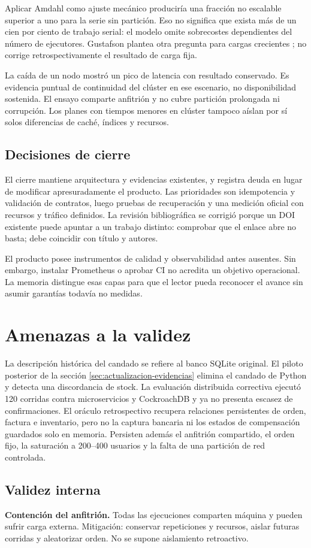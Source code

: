 \documentclass[12pt,a4paper]{article}
\newcommand{\seccion}[1]{\section{#1}}
\begin{document}
Aplicar Amdahl como ajuste mecánico produciría una fracción no escalable superior a uno para la serie sin partición. Eso no significa que exista más de un cien por ciento de trabajo serial: el modelo omite sobrecostes dependientes del número de ejecutores. Gustafson plantea otra pregunta para cargas crecientes \cite{gustafson1988reevaluating}; no corrige retrospectivamente el resultado de carga fija.

La caída de un nodo mostró un pico de latencia con resultado conservado. Es evidencia puntual de continuidad del clúster en ese escenario, no disponibilidad sostenida. El ensayo comparte anfitrión y no cubre partición prolongada ni corrupción. Los planes con tiempos menores en clúster tampoco aíslan por sí solos diferencias de caché, índices y recursos.

\subsection{Decisiones de cierre}
El cierre mantiene arquitectura y evidencias existentes, y registra deuda en lugar de modificar apresuradamente el producto. Las prioridades son idempotencia y validación de contratos, luego pruebas de recuperación y una medición oficial con recursos y tráfico definidos. La revisión bibliográfica se corrigió porque un DOI existente puede apuntar a un trabajo distinto: comprobar que el enlace abre no basta; debe coincidir con título y autores.

El producto posee instrumentos de calidad y observabilidad antes ausentes. Sin embargo, instalar Prometheus o aprobar CI no acredita un objetivo operacional. La memoria distingue esas capas para que el lector pueda reconocer el avance sin asumir garantías todavía no medidas.

\seccion{Amenazas a la validez}
La descripción histórica del candado se refiere al banco SQLite original. El piloto posterior de la sección \ref{sec:actualizacion-evidencias} elimina el candado de Python y detecta una discordancia de stock. La evaluación distribuida correctiva ejecutó 120 corridas contra microservicios y CockroachDB y ya no presenta escasez de confirmaciones. El oráculo retrospectivo recupera relaciones persistentes de orden, factura e inventario, pero no la captura bancaria ni los estados de compensación guardados solo en memoria. Persisten además el anfitrión compartido, el orden fijo, la saturación a 200--400 usuarios y la falta de una partición de red controlada.
\subsection{Validez interna}
\textbf{Contención del anfitrión.} Todas las ejecuciones comparten máquina y pueden sufrir carga externa. Mitigación: conservar repeticiones y recursos, aislar futuras corridas y aleatorizar orden. No se supone aislamiento retroactivo.
\end{document}
